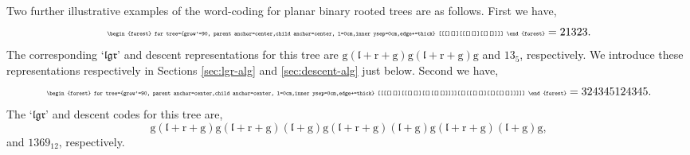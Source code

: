 \documentclass[5p,twocolumn]{elsarticle}
\newcommand*{\el}{\mathfrak l}
\newcommand*{\gl}{\mathfrak g}
\newcommand*{\rl}{\mathfrak r}
\begin{document}
\begin{example}\label{ex:wordordering}
  Two further illustrative examples of the word-coding for planar binary rooted trees are as follows. First we have,
  \begin{equation*}
    {\tiny \begin{forest} for tree={grow'=90, parent anchor=center,child anchor=center, l=0cm,inner ysep=0cm,edge+=thick} [[[][]][[[][]][[][]]]] \end{forest}}=21323.
  \end{equation*}
  The corresponding `$\el\gl\rl$' and descent representations for this tree are $\mathrm{g(\el\!+\!r\!+\!g)g(\el\!+\!r\!+\!g)g}$ and $13_5$, respectively.
  We introduce these representations respectively in Sections \ref{sec:lgr-alg} and \ref{sec:descent-alg} just below. Second we have,
  \begin{equation*}
    {\tiny \begin{forest} for tree={grow'=90, parent anchor=center,child anchor=center, l=0cm,inner ysep=0cm,edge+=thick} [[[[][]][[[][]][[][[][]]]]][[][[[][]][[][[][]]]]]] \end{forest}}=324345124345.
  \end{equation*}
  The `$\el\gl\rl$' and descent codes for this tree are,
  \begin{equation*}
    \mathrm{g(\el\!+\!r\!+\!g)g(\el\!+\!r\!+\!g)(\el\!+\!g)g(\el\!+\!r\!+\!g)(\el\!+\!g)g(\el\!+\!r\!+\!g)(\el\!+\!g)g},
  \end{equation*}
  and $1369_{12}$, respectively.
\end{example}
\end{document}
